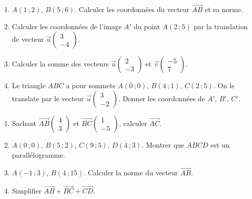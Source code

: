 \begin{enumerate}[label=\arabic*)]
\item $A(1\,;2)$, $B(5\,;6)$. Calculer les coordonnées du vecteur $\vec{AB}$ et sa norme.
\item Calculer les coordonnées de l'image $A'$ du point $A(2\,;5)$ par la translation de
vecteur $\vec u\begin{pmatrix}3\\-4\end{pmatrix}$.
\item Calculer la somme des vecteurs $\vec u\begin{pmatrix}2\\-3\end{pmatrix}$ et
$\vec v\begin{pmatrix}-5\\7\end{pmatrix}$.
\item Le triangle $ABC$ a pour sommets $A(0\,;0)$, $B(4\,;1)$, $C(2\,;5)$. On le translate
par le vecteur $\vec u\begin{pmatrix}3\\-2\end{pmatrix}$. Donner les coordonnées de $A'$,
$B'$, $C'$.
\end{enumerate}

\begin{enumerate}[label=\arabic*)]
\item Sachant $\vec{AB}\begin{pmatrix}4\\3\end{pmatrix}$ et
$\vec{BC}\begin{pmatrix}1\\-5\end{pmatrix}$, calculer $\vec{AC}$.
\item $A(0\,;0)$, $B(5\,;2)$, $C(9\,;5)$, $D(4\,;3)$. Montrer que $ABCD$ est un
parallélogramme.
\item $A(-1\,;3)$, $B(4\,;15)$. Calculer la norme du vecteur $\vec{AB}$.
\item Simplifier $\vec{AB}+\vec{BC}+\vec{CD}$.
\end{enumerate}

